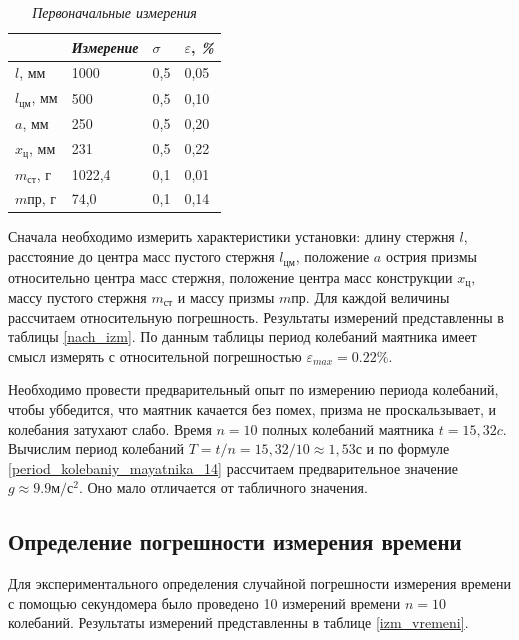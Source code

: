 \documentclass[a4paper,12pt]{article}
\begin{document}
\begin{table}[]
\caption{\textit{Первоначальные измерения}}
\label{nach_izm}
\begin{center}
	\begin{tabular}{|l|l|l|l|}
	\hline
                       & \textit{Измерение} & $\sigma$   & $\varepsilon$, \textit{\%} \\ \hline
	$l$, мм  & 1000      & 0,5 & 0,05  \\ \hline
	$l_{\text{цм}}$, мм & 500       & 0,5 & 0,10  \\ \hline
	$a$, мм                  & 250       & 0,5 & 0,20  \\ \hline
	$x_{\text{ц}}$, мм                 & 231       & 0,5 & 0,22  \\ \hline
	$m_{\text{ст}}$, г & 1022,4    & 0,1 & 0,01  \\ \hline
	$m{\text{пр}}$, г  & 74,0      & 0,1 & 0,14  \\ \hline
	\end{tabular}
\end{center}
\end{table}

Сначала необходимо измерить характеристики установки: длину стержня $l$, расстояние до центра масс пустого стержня $l_{\text{цм}}$, положение $a$ острия призмы относительно центра масс стержня, положение центра масс конструкции $x_{\text{ц}}$, массу пустого стержня $m_{\text{ст}}$ и массу призмы $m{\text{пр}}$. Для каждой величины рассчитаем относительную погрешность. Результаты измерений представленны в таблицы \eqref{nach_izm}. По данным таблицы период колебаний маятника имеет смысл измерять с относительной погрешностью $\varepsilon_{max} = 0.22 \%$.


Необходимо провести предварительный опыт по измерению периода колебаний, чтобы уббедится, что маятник качается без помех, призма не проскальзывает, и колебания затухают слабо. Время $n = 10$ полных колебаний маятника $t = 15,32 c$. Вычислим период колебаний $T = t/n = 15,32/10 \approx 1,53 с$ и по формуле \eqref{period_kolebaniy_mayatnika_14} рассчитаем предварительное значение $g \approx 9.9 м/с^2$.  Оно мало отличается от табличного значения.


\subsection{Определение погрешности измерения времени}

Для экспериментального определения случайной погрешности измерения времени с помощью секундомера было проведено 10 измерений времени $n = 10$ колебаний. Результаты измерений представленны в таблице \ref{izm_vremeni}.
\end{document}
